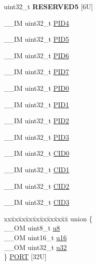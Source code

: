 \begin{DoxyCompactItemize}
\mbox{\label{struct_i_t_m___type_a4355af3f12b210d606cb9169c73be71a}} 
uint32\+\_\+t {\bfseries R\+E\+S\+E\+R\+V\+E\+D5} \mbox{[}6\+U\mbox{]}
\item 
\+\_\+\+\_\+\+IM uint32\+\_\+t \hyperlink{struct_i_t_m___type_a4c002e97cda2375d7421ad6415b6a02f}{P\+I\+D4}
\item 
\+\_\+\+\_\+\+IM uint32\+\_\+t \hyperlink{struct_i_t_m___type_ac085b26f43fefeef9a4cf5c2af5e4a38}{P\+I\+D5}
\item 
\+\_\+\+\_\+\+IM uint32\+\_\+t \hyperlink{struct_i_t_m___type_a83ac5d00dee24cc7f805b5c147625593}{P\+I\+D6}
\item 
\+\_\+\+\_\+\+IM uint32\+\_\+t \hyperlink{struct_i_t_m___type_af8aa73aeaf37bdf7dfd9f6c437ff2d2f}{P\+I\+D7}
\item 
\+\_\+\+\_\+\+IM uint32\+\_\+t \hyperlink{struct_i_t_m___type_a6e3343cc3c4a8a5a6f14937882e9202a}{P\+I\+D0}
\item 
\+\_\+\+\_\+\+IM uint32\+\_\+t \hyperlink{struct_i_t_m___type_afa06959344f4991b00e6c545dd2fa30b}{P\+I\+D1}
\item 
\+\_\+\+\_\+\+IM uint32\+\_\+t \hyperlink{struct_i_t_m___type_a63db39f871596d28e69c283288ea2eba}{P\+I\+D2}
\item 
\+\_\+\+\_\+\+IM uint32\+\_\+t \hyperlink{struct_i_t_m___type_ac2d006eed52ba550a309e5f61ed9c401}{P\+I\+D3}
\item 
\+\_\+\+\_\+\+IM uint32\+\_\+t \hyperlink{struct_i_t_m___type_a26bbad5d9e0f1d302611d52373aef839}{C\+I\+D0}
\item 
\+\_\+\+\_\+\+IM uint32\+\_\+t \hyperlink{struct_i_t_m___type_a4e60a608afd6433ecd943d95e417b80b}{C\+I\+D1}
\item 
\+\_\+\+\_\+\+IM uint32\+\_\+t \hyperlink{struct_i_t_m___type_ad98950702e55d1851e91b22de07b11aa}{C\+I\+D2}
\item 
\+\_\+\+\_\+\+IM uint32\+\_\+t \hyperlink{struct_i_t_m___type_ab9af64f413bf6f67e2a8044481292f67}{C\+I\+D3}
\item 
\begin{tabbing}
xx\=xx\=xx\=xx\=xx\=xx\=xx\=xx\=xx\=\kill
union \{\\
\>\_\_OM uint8\_t \hyperlink{struct_i_t_m___type_a4c0550e859d614c607bd4b575f05425c}{u8}\\
\>\_\_OM uint16\_t \hyperlink{struct_i_t_m___type_ae93660eefe2482a8564fae9a1ca39739}{u16}\\
\>\_\_OM uint32\_t \hyperlink{struct_i_t_m___type_ae89dd50f788f12863c681fba1a5b60d1}{u32}\\
\} \hyperlink{struct_i_t_m___type_aff9add4806ce61d03f079a7f5e07ccf6}{PORT} \mbox{[}32U\mbox{]}\\


\end{tabbing}
\end{DoxyCompactItemize}
